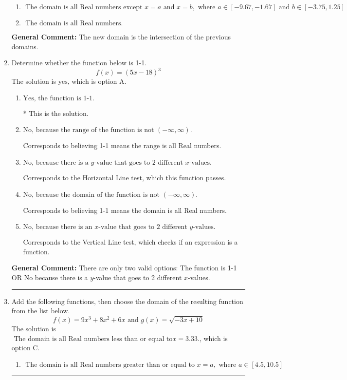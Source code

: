 \documentclass{extbook}[14pt]
\newcommand{\litem}[1]{\item #1

\rule{\textwidth}{0.4pt}}
\begin{document}
\begin{enumerate}
{\begin{enumerate}[label=\Alph*.]
\item \( \text{ The domain is all Real numbers except } x = a \text{ and } x = b, \text{ where } a \in [-9.67, -1.67] \text{ and } b \in [-3.75, 1.25] \)


\item \( \text{ The domain is all Real numbers. } \)


\end{enumerate}

\textbf{General Comment:} The new domain is the intersection of the previous domains.
}
\litem{
Determine whether the function below is 1-1.
\[ f(x) = (5 x - 18)^3 \]The solution is \( \text{yes} \), which is option A.\begin{enumerate}[label=\Alph*.]
\item \( \text{Yes, the function is 1-1.} \)

* This is the solution.
\item \( \text{No, because the range of the function is not $(-\infty, \infty)$.} \)

Corresponds to believing 1-1 means the range is all Real numbers.
\item \( \text{No, because there is a $y$-value that goes to 2 different $x$-values.} \)

Corresponds to the Horizontal Line test, which this function passes.
\item \( \text{No, because the domain of the function is not $(-\infty, \infty)$.} \)

Corresponds to believing 1-1 means the domain is all Real numbers.
\item \( \text{No, because there is an $x$-value that goes to 2 different $y$-values.} \)

Corresponds to the Vertical Line test, which checks if an expression is a function.
\end{enumerate}

\textbf{General Comment:} There are only two valid options: The function is 1-1 OR No because there is a $y$-value that goes to 2 different $x$-values.
}
\litem{
Add the following functions, then choose the domain of the resulting function from the list below.
\[ f(x) = 9x^{3} +8 x^{2} +6 x \text{ and } g(x) = \sqrt{-3x+10}  \]The solution is \( \text{ The domain is all Real numbers less than or equal to} x = 3.33. \), which is option C.\begin{enumerate}[label=\Alph*.]
\item \( \text{ The domain is all Real numbers greater than or equal to } x = a, \text{ where } a \in [4.5, 10.5] \)



\end{enumerate}}
\end{enumerate}
\end{document}
